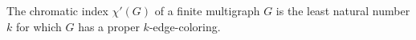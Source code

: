 \begin{definition}
The chromatic index $\chi'(G)$ of a finite multigraph $G$ is the least
natural number $k$ for which $G$ has a proper $k$-edge-coloring.
\end{definition}
